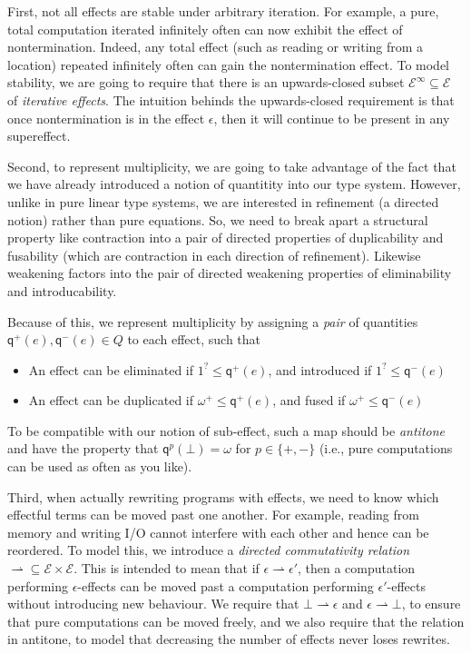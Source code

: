 \documentclass[acmsmall,screen,review]{acmart}
\newcommand{\mc}[1]{\ensuremath{\mathcal{#1}}}
\newcommand{\ms}[1]{\ensuremath{\mathsf{#1}}}
\newcommand{\rightmove}{\rightharpoonup}
\newcommand{\delq}{1^?}
\newcommand{\cpyq}{\omega^+}
\newcommand{\topq}{\omega}
\newcommand{\alquant}{\ms{q}}
\begin{document}
First, not all effects are stable under arbitrary iteration. For example, a pure, total computation
iterated infinitely often can now exhibit the effect of nontermination. Indeed, any total effect
(such as reading or writing from a location) repeated infinitely often can gain the nontermination
effect. To model stability, we are going to require that there is an upwards-closed subset
$\mc{E}^\infty \subseteq \mc{E}$ of \emph{iterative effects}. The intuition behinds the
upwards-closed requirement is that once nontermination is in the effect $\epsilon$, then it will
continue to be present in any supereffect.

Second, to represent multiplicity, we are going to take advantage of the fact that we have already
introduced a notion of quantitity into our type system.  However, unlike in pure linear type
systems, we are interested in refinement (a directed notion) rather than pure equations.  So, we
need to break apart a structural property like contraction into a pair of directed properties of
duplicability and fusability (which are contraction in each direction of refinement). Likewise
weakening factors into the pair of directed weakening properties of eliminability and
introducability.

Because of this, we represent multiplicity by assigning a \emph{pair} of quantities $\alquant^+(e),
\alquant^-(e) \in Q$ to each effect, such that
\begin{itemize}
  \item An effect can be eliminated if $\delq \leq \alquant^+(e)$, and introduced if $\delq \leq
  \alquant^-(e)$
  \item An effect can be duplicated if $\cpyq \leq \alquant^+(e)$, and fused if $\cpyq \leq
  \alquant^-(e)$
\end{itemize}
To be compatible with our notion of sub-effect, such a map should be \emph{antitone} and have
the property that $\alquant^p(\bot) = \topq$ for $p \in \{+, -\}$ (i.e., pure computations can
be used as often as you like).

Third, when actually rewriting programs with effects, we need to know which effectful terms can be
moved past one another. For example, reading from memory and writing I/O cannot interfere with each
other and hence can be reordered. To model this, we introduce a \emph{directed commutativity
relation} $\rightmove \subseteq \mc{E} \times \mc{E}$. This is intended to mean that if $\epsilon
\rightmove \epsilon'$, then a computation performing $\epsilon$-effects can be moved past a
computation performing $\epsilon'$-effects without introducing new behaviour. We require that $\bot
\rightmove \epsilon$ and $\epsilon \rightmove \bot$, to ensure that pure computations can be moved
freely, and we also require that the relation in antitone, to model that decreasing the number of
effects never loses rewrites. 
\end{document}
